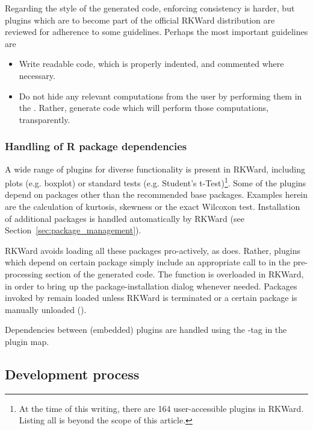 Regarding the style of the generated  code, enforcing consistency is harder,
but plugins which are to become part of the official RKWard distribution are
reviewed for adherence to some guidelines. Perhaps the most important guidelines
are 

\begin{itemize}
  \item 
  Write readable code, which is properly indented, and commented where necessary.

  \item 
  Do not hide any relevant computations from the user by performing them in the
  . Rather, generate  code which will perform
  those computations, transparently.
\end{itemize}

\subsubsection{Handling of R package dependencies}
\label{sec:technical_plugins_dependencies}
A wide range of plugins for diverse functionality is present in RKWard,
including plots (e.g. boxplot) or standard tests (e.g. Student's t-Test)\footnote{
  At the time of this writing, there are 164 user-accessible plugins in RKWard.
  Listing all is beyond the scope of this article.
}. Some
of the plugins depend on  packages other than the recommended  base packages.
Examples herein are the calculation of kurtosis, skewness or the exact Wilcoxon
test. Installation of additional packages is handled automatically by RKWard
(see Section~\ref{sec:package_management}).

RKWard avoids loading all these packages pro-actively, as  does. Rather,
plugins which depend on certain package simply include an appropriate call to
 in the pre-processing section of the generated  code. The 
function is overloaded in RKWard, in order to bring up the package-installation
dialog whenever needed. Packages invoked by  remain loaded unless
RKWard is terminated or a certain package is manually unloaded ().

Dependencies between (embedded) plugins are handled using the -tag in the plugin map.

\subsection{Development process}
